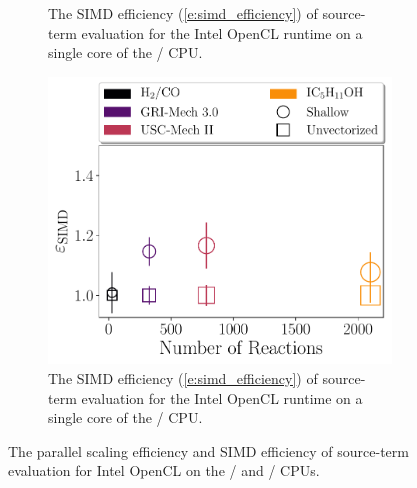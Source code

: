 \documentclass[12pt,number,sort&compress,preprint]{elsarticle}
\begin{document}
\begin{figure}[htbp]
\begin{subfigure}[t]{0.48\linewidth}
      \caption{The SIMD efficiency (\cref{e:simd_efficiency}) of source-term evaluation for the Intel OpenCL runtime on a single core of the \avx/ CPU.}
      \label{F:source_simd_scaling}
  \end{subfigure}
  \hfill
  \begin{subfigure}[t]{0.48\linewidth}
      \includegraphics[width=\textwidth]{source_sse_simd_efficiency.pdf}
      \caption{The SIMD efficiency (\cref{e:simd_efficiency}) of source-term evaluation for the Intel OpenCL runtime on a single core of the \sse/ CPU.}
      \label{F:source_sse_simd_scaling}
  \end{subfigure}
  \caption{The parallel scaling efficiency and SIMD efficiency of source-term evaluation for Intel OpenCL on the \avx/ and \sse/ CPUs.}
  \label{F:source_scaling}
\end{figure}
\end{document}
